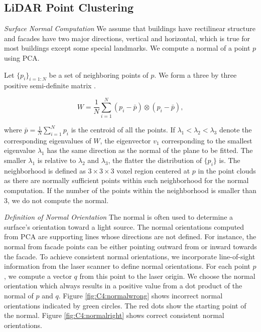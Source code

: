 \subsection{LiDAR Point Clustering}

{\it Surface Normal Computation} We assume that buildings have rectilinear structure and facades have two major directions, vertical and horizontal, which is true for most buildings except some special landmarks. We compute a normal of a point $p$ using PCA.  

Let $\{p_i\}_{i=1:N}$ be a set of neighboring points of $p$. We form a three by three positive semi-definite matrix \cite{Hoppe92}.

\begin{equation}
W = \frac{1}{N}\sum_{i=1}^{N} (p_i - \bar{p})\otimes(p_i - \bar{p}),
\label{eq:C4:PCA}
\end{equation} 

where $\bar{p} = \frac{1}{N}\sum_{i=1}^{N} p_i$ is the centroid of all the points. If $\lambda_1 < \lambda_2 < \lambda_3$ denote the corresponding eigenvalues of $W$, the eigenvector $v_1$ corresponding to the smallest eigenvalue $\lambda_1$ has the same direction as the normal of the plane to be fitted. The smaller $\lambda_1$ is relative to $\lambda_2$ and $\lambda_3$, the flatter the distribution of $\{p_i\}$ is. The neighborhood is defined as $3\times3\times3$  voxel region centered at $p$ in the point clouds as there are normally sufficient points within such neighborhood for the normal computation. If the number of the points within the neighborhood is smaller than 3, we do not compute the normal. 

{\it Definition of Normal Orientation} The normal is often used to determine a surface's orientation toward a light source. The normal orientations computed from PCA are supporting lines whose directions are not defined. For instance, the normal from facade points can be either pointing outward from or inward towards the facade. To achieve consistent normal orientations, we incorporate line-of-sight information from the laser scanner to define normal orientations. For each point $p$, we compute a vector $q$ from this point to the laser origin. We choose the normal orientation which always results in a positive value from a dot product of the normal of $p$ and $q$.  Figure \ref{fig:C4:normalwrong} shows incorrect normal orientations indicated by green circles.  The red dots show the starting point of the normal. Figure \ref{fig:C4:normalright} shows correct consistent normal orientations.

